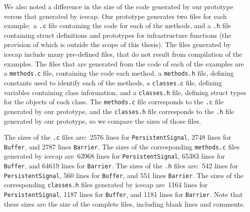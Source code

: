 {We also noted a difference in the size of the code generated by our
prototype versus that generated by icecap.
Our prototype generates two files for each example:~a \texttt{.c} file
containing the code for each of the methods, and a \texttt{.h} file
containing struct definitions and prototypes for infrastructure
functions (the provision of which is outside the scope of this
thesis).
The files generated by icecap include many pre-defined files, that do
not result from compilation of the examples.
The files that are generated from the code of each of the examples are
a \texttt{methods.c} file, containing the code each method, a
\texttt{methods.h} file, defining constants used to identify each of
the methods, a \texttt{classes.c} file, defining variables containing
class information, and a \texttt{classes.h} file, defining struct
types for the objects of each class.
The \texttt{methods.c} file corresponds to the \texttt{.c} file
generated by our prototype, and the \texttt{classes.h} file
corresponds to the \texttt{.h} file generated by our prototype, so we
compare the sizes of those files.

The sizes of the \texttt{.c} files are:~2576 lines for
\texttt{PersistentSignal}, 2748 lines for \texttt{Buffer}, and 2787
lines \texttt{Barrier}.
The sizes of the corresponding \texttt{methods.c} files generated by
icecap are~63968 lines for \texttt{PersistentSignal}, 65383 lines for
\texttt{Buffer}, and 64619 lines for \texttt{Barrier}.
The sizes of the \texttt{.h} files are:~542 lines for
\texttt{PersistentSignal}, 560 lines for \texttt{Buffer}, and 551
lines \texttt{Barrier}.
The sizes of the corresponding \texttt{classes.h} files generated by
icecap are~1164 lines for \texttt{PersistentSignal}, 1187 lines for
\texttt{Buffer}, and 1181 lines for \texttt{Barrier}.
Note that these sizes are the size of the complete files, including
blank lines and comments.

}
